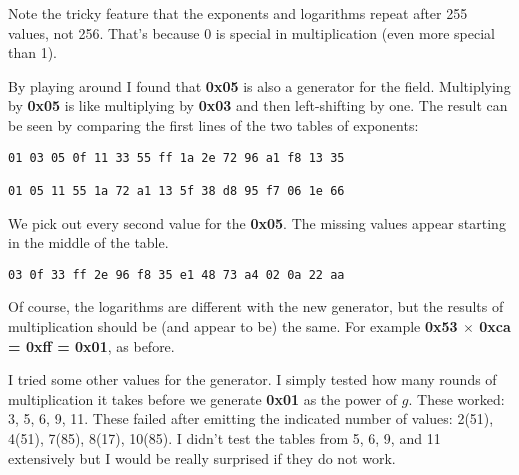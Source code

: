 \documentclass[11pt, oneside]{article}
\begin{document}
Note the tricky feature that the exponents and logarithms repeat after 255 values, not 256.  That's because 0 is special in multiplication (even more special than 1).

By playing around I found that \textbf{0x05} is also a generator for the field.  Multiplying by \textbf{0x05} is like multiplying by \textbf{0x03} and then left-shifting by one.  The result can be seen by comparing the first lines of the two tables of exponents:

\begin{verbatim}
01 03 05 0f 11 33 55 ff 1a 2e 72 96 a1 f8 13 35

01 05 11 55 1a 72 a1 13 5f 38 d8 95 f7 06 1e 66
\end{verbatim}

We pick out every second value for the \textbf{0x05}.  The missing values appear starting in the middle of the table.

\begin{verbatim}
03 0f 33 ff 2e 96 f8 35 e1 48 73 a4 02 0a 22 aa
\end{verbatim}

Of course, the logarithms are different with the new generator, but the results of multiplication should be (and appear to be) the same.  For example \textbf{0x53 $\times$ 0xca = 0xff = 0x01}, as before.

I tried some other values for the generator.  I simply tested how many rounds of multiplication it takes before we generate \textbf{0x01} as the power of $g$.  These worked:  3, 5, 6, 9, 11.  These failed after emitting the indicated number of values:  2(51), 4(51), 7(85), 8(17), 10(85).  I didn't test the tables from 5, 6, 9, and 11 extensively but I would be really surprised if they do not work.
\end{document}
